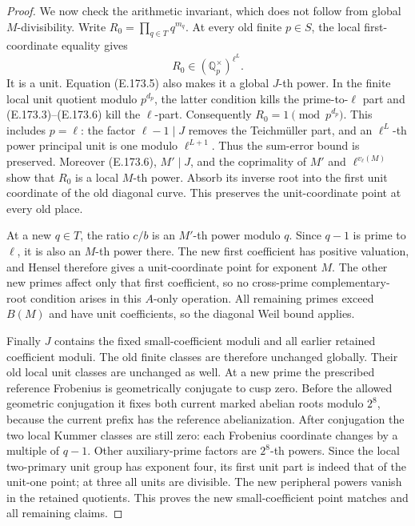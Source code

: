 \begin{proof}
We now check the arithmetic invariant, which does not follow
from global \(M\)-divisibility. Write
\(R_0=\prod_{q\in T}q^{m_q}\). At every old finite
\(p\in S\), the local first-coordinate equality gives
\[
                       R_0\in(\mathbb Q_p^\times)^{\ell^L}.
 \tag{E.173.6}
\]
It is a unit. Equation (E.173.5) also makes it a global
\(J\)-th power. In the finite local unit quotient modulo
\(p^{d_p}\), the latter condition kills the prime-to-\(\ell\)
part and (E.173.3)--(E.173.6) kill the \(\ell\)-part.
Consequently \(R_0=1\pmod{p^{d_p}}\). This includes
\(p=\ell\): the factor \(\ell-1\mid J\) removes the
Teichm\"uller part, and an \(\ell^L\)-th power principal unit
is one modulo \(\ell^{L+1}\).
Thus the sum-error bound is preserved.
Moreover (E.173.6), \(M'\mid J\), and the coprimality of
\(M'\) and \(\ell^{v_\ell(M)}\) show that \(R_0\) is a
local \(M\)-th power. Absorb its inverse root into the first
unit coordinate of the old diagonal curve. This preserves the
unit-coordinate point at every old place.

At a new \(q\in T\), the ratio \(c/b\) is an
\(M'\)-th power modulo \(q\). Since \(q-1\) is prime to
\(\ell\), it is also an \(M\)-th power there.
The new first coefficient has positive valuation, and Hensel
therefore gives a unit-coordinate point for exponent \(M\).
The other new primes affect only that first coefficient, so
no cross-prime complementary-root condition arises in this
\(A\)-only operation. All remaining primes exceed \(B(M)\)
and have unit coefficients, so the diagonal Weil bound applies.

Finally \(J\) contains the fixed small-coefficient moduli and
all earlier retained coefficient moduli. The old finite classes
are therefore unchanged globally. Their old local unit classes
are unchanged as well. At a new prime the prescribed reference
Frobenius is geometrically conjugate to cusp zero. Before the
allowed geometric conjugation it fixes both current marked
abelian roots modulo \(2^8\), because the current prefix has
the reference abelianization. After conjugation the two local
Kummer classes are still zero: each Frobenius coordinate changes
by a multiple of \(q-1\). Other auxiliary-prime factors are
\(2^8\)-th powers. Since the local two-primary unit group has
exponent four, its first unit part is indeed that of the
unit-one point; at three all units are divisible. The new
peripheral powers vanish in the retained quotients. This proves
the new small-coefficient point matches and all remaining claims.
\end{proof}

